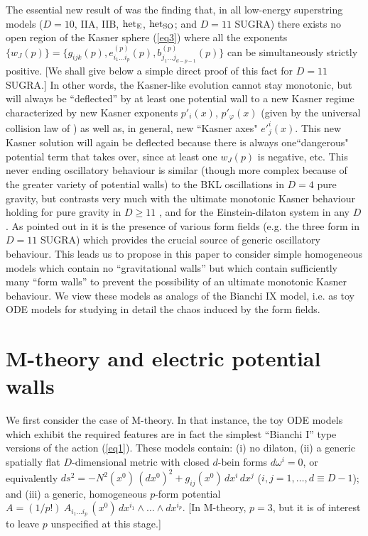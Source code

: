 \documentclass[a4paper,12pt]{article}
\begin{document}
The essential new result of \cite{dh1} was the finding that, in all 
low-energy superstring models ($D=10$, IIA, IIB, ${\rm het}_{\rm E}$, 
${\rm het}_{\rm SO}$; and $D=11$ SUGRA) there exists no open region 
of the Kasner sphere (\ref{eq3}) where all the exponents $\{ w_J (p) 
\} = \{ g_{ijk} (p), e_{i_1 \ldots i_p}^{(p)} (p) , b_{j_1 \ldots 
j_{d-p-1}}^{(p)} (p) \}$ can be simultaneously strictly positive. 
[We shall give below a simple direct proof of this fact for $D=11$ 
SUGRA.] In other words, the Kasner-like evolution
cannot stay 
monotonic, but will always be ``deflected'' by at least one 
potential wall to a new Kasner regime characterized by new Kasner
exponents $p'_i(x)$, $p'_\varphi (x)$ (given by the universal 
collision law of \cite{dh1}) as well as, in general, new
``Kasner axes" $e'^i_j(x)$.  This new Kasner solution will
again be deflected because there is always one``dangerous"
potential term that takes over, since at least one $ w_J (p)$ 
is negative, etc.
This never ending oscillatory behaviour is similar (though more 
complex because of the greater variety of potential walls) to the BKL 
oscillations in $D=4$ pure gravity, but contrasts very much with the 
ultimate monotonic Kasner behaviour holding for pure gravity in $D 
\geq 11$ \cite{DHS}, and for the Einstein-dilaton system in any $D$ 
\cite{BK73}. As pointed out in \cite{dh1} it is the presence of 
various form fields (e.g. the three form in $D=11$ SUGRA) which 
provides the crucial source of generic oscillatory behaviour. This 
leads us to propose in this paper to consider simple homogeneous 
models which contain no ``gravitational walls'' but which contain 
sufficiently many ``form walls'' to prevent the possibility of an 
ultimate monotonic Kasner behaviour. We view these models as analogs 
of the Bianchi IX model, i.e. as toy ODE models for studying in 
detail the chaos induced by the form fields.

\section{M-theory and electric potential walls}
We first consider the case of M-theory.  
In that instance,
the toy ODE models which exhibit the required features
are in fact the simplest ``Bianchi I'' 
type versions of the action (\ref{eq1}).
These models contain: (i) no 
dilaton, (ii) a generic spatially flat $D$-dimensional metric 
with closed $d$-bein forms $d \omega^i = 0$, or 
equivalently 
$ds^2 =  - N^2 (x^0) \, (dx^0)^2 
+ g_{ij} (x^0) \, dx^i \, dx^j$ ($i,j = 1 , \ldots , d \equiv D-1$);
and (iii) a generic, homogeneous $p$-form potential
$A = (1/p!) \ A_{i_1 \ldots i_p} \, (x^0) \, dx^{i_1} \wedge 
\ldots \wedge dx^{i_p}$. 
[In M-theory, $p=3$, but it is of interest to leave $p$ unspecified
at this stage.]
\end{document}
